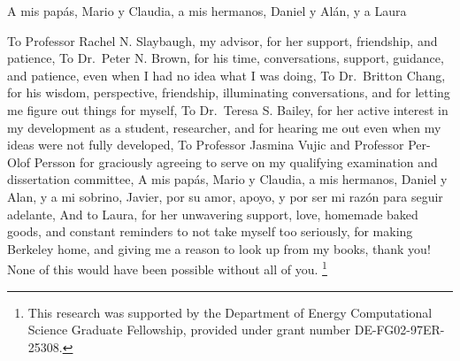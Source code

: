 \documentclass{ucbthesis}
\theoremstyle{definition}
\begin{document}
\begin{frontmatter}

\begin{dedication}
\null\vfil
\begin{center}
A mis pap\'{a}s, Mario y Claudia, a mis hermanos, Daniel y Al\'{a}n, y a Laura\\\vspace{12pt}
\end{center}
\vfil\null
\end{dedication}


\tableofcontents
\clearpage
\listoffigures
\clearpage
\listoftables

\begin{acknowledgements}

To Professor Rachel N. Slaybaugh, my advisor, for her support, friendship, and patience,
\null\vfil
To Dr.~Peter N. Brown, for his time, conversations, support, guidance, and patience, even when I had no idea what I was doing,
\null\vfil
To Dr.~Britton Chang, for his wisdom, perspective, friendship, illuminating conversations, and for letting me figure out things for myself,
\null\vfil
To Dr.~Teresa S. Bailey, for her active interest in my development as a student, researcher, and for hearing me out even when my ideas were not fully developed,
\null\vfil
To Professor Jasmina Vujic and Professor Per-Olof Persson for graciously agreeing to serve on my qualifying examination and dissertation committee,
\null\vfil
A mis pap\'{a}s, Mario y Claudia, a mis hermanos, Daniel y Alan, y a mi sobrino, Javier, por su amor, apoyo, y por ser mi raz\'{o}n para seguir adelante,
\null\vfil
And to Laura, for her unwavering support, love, homemade baked goods, and constant reminders to not take myself too seriously, for making Berkeley home, and giving me a reason to look up from my books,
\null\vfil
thank you! None of this would have been possible without all of you.
\let\thefootnote\relax\footnote{This research was supported by the Department of Energy Computational Science Graduate Fellowship, provided under grant number DE-FG02-97ER-25308.}


\end{acknowledgements}

\end{frontmatter}

\pagestyle{headings}

\end{document}
